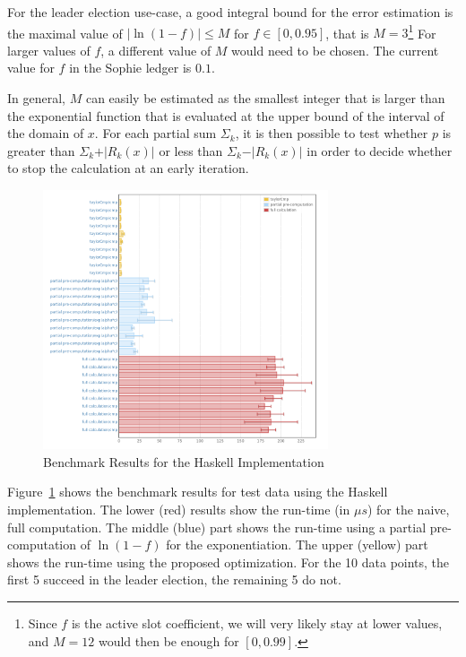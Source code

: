 \documentclass[11pt,a4paper,dvipsnames,twosided]{article}
\theoremstyle{definition}
\theoremstyle{definition}
\begin{document}
For the leader election use-case, a good integral bound for the error estimation
is the maximal value of $\vert\ln(1 - f)\vert\leq M$ for $f \in [0, 0.95]$, that
is $M = 3$\footnote{Since $f$ is the active slot coefficient, we will very
  likely stay at lower values, and $M=12$ would then be enough for $[0, 0.99].$}
For larger values of $f$, a different value of $M$ would need to be chosen. The
current value for $f$ in the Sophie ledger is $0.1$.

In general, $M$ can easily be estimated as the smallest
integer that is larger than the exponential function that is evaluated at
the upper bound of the interval of the domain of $x$. For each partial sum $\Sigma_{k}$, it
is then possible to test whether $p$ is greater than $\Sigma_k + \vert R_{k}(x) \vert$ or less than
$\Sigma_k - \vert R_{k}(x)\vert$ in order to decide whether to stop the calculation at an early
iteration.

\begin{figure}[ht]
  \centering
  \includegraphics[width=0.75\textwidth]{haskell.png}
  \caption{Benchmark Results for the Haskell Implementation}
  \label{fig:haskell-optimization-results}
\end{figure}

Figure~\ref{fig:haskell-optimization-results} shows the benchmark results for
test data using the Haskell implementation. The lower (red) results show the
run-time (in $\mu s$) for the naive, full computation. The middle (blue) part
shows the run-time using a partial pre-computation of $\ln (1-f)$ for the
exponentiation. The upper (yellow) part shows the run-time using the proposed
optimization. For the 10 data points, the first 5 succeed in the leader
election, the remaining 5 do not.

% 


\end{document}
